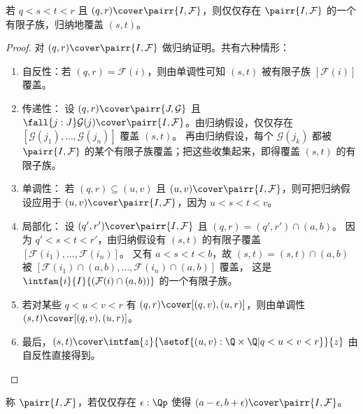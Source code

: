 \begin{lem} \label{reals-formal-topology-locally-compact}
  若 $q < s < t < r$ 且 $(q, r) \cover \pairr{I, \mathcal{F}}$，则仅仅存在 $\pairr{I, \mathcal{F}}$ 的一个有限子族，归纳地覆盖 $(s, t)$。
\end{lem}

\begin{proof}
  对 $(q, r) \cover \pairr{I, \mathcal{F}}$ 做归纳证明。共有六种情形：
  \begin{enumerate}

  \item 自反性：若 $(q, r) = \mathcal{F}(i)$，则由单调性可知 $(s, t)$ 被有限子族 $[\mathcal{F}(i)]$ 覆盖。

  \item 传递性：
    设 $(q, r) \cover \pairr{J, \mathcal{G}}$ 且 $\fall{j : J} \mathcal{G}(j) \cover
    \pairr{I, \mathcal{F}}$。由归纳假设，仅仅存在
    $[\mathcal{G}(j_1), \ldots, \mathcal{G}(j_n)]$ 覆盖 $(s, t)$。
    再由归纳假设，每个 $\mathcal{G}(j_k)$ 都被 $\pairr{I, \mathcal{F}}$ 的某个有限子族覆盖；把这些收集起来，即得覆盖 $(s, t)$ 的有限子族。

  \item 单调性：
    若 $(q, r) \subseteq (u, v)$ 且 $(u, v) \cover \pairr{I, \mathcal{F}}$，则可把归纳假设应用于 $(u, v) \cover \pairr{I, \mathcal{F}}$，因为 $u <
    s < t < v$。

  \item 局部化：
    设 $(q', r') \cover \pairr{I, \mathcal{F}}$ 且 $(q, r) = (q', r') \cap (a, b)$。
    因为 $q' < s < t < r'$，由归纳假设有 $(s, t)$ 的有限子覆盖
    $[\mathcal{F}(i_1), \ldots, \mathcal{F}(i_n)]$。
    又有 $a < s <
    t < b$，故 $(s, t) = (s, t) \cap (a, b)$ 被
    $[\mathcal{F}(i_1) \cap (a,b), \ldots, \mathcal{F}(i_n) \cap (a,b)]$ 覆盖，
    这是 $\intfam{i}{I}{(\mathcal{F}(i) \cap (a, b))}$ 的一个有限子族。

  \item 若对某些 $q < u < v < r$ 有 $(q, r) \cover [(q, v), (u, r)]$，则由单调性
    $(s, t) \cover [(q, v), (u, r)]$。

  \item 最后，$(s, t) \cover \intfam{z}{\setof{ (u,v):\Q \times \Q | q < u < v < r}}{z}$ 由自反性直接得到。\qedhere
  \end{enumerate}
\end{proof}

称 $\pairr{I, \mathcal{F}}$，若仅仅存在 $\epsilon : \Qp$ 使得 $(a - \epsilon, b +
\epsilon) \cover \pairr{I, \mathcal{F}}$。

